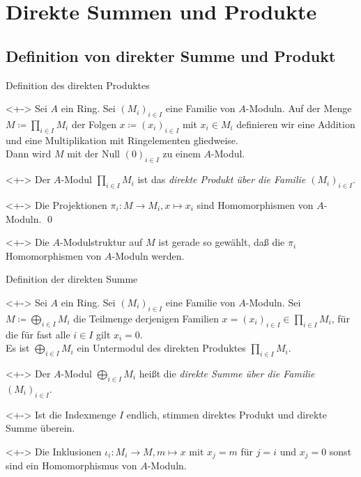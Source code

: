 \section{Direkte Summen und Produkte}

\subsection{Definition von direkter Summe und Produkt}

\begin{frame}{Definition des direkten Produktes}
	\begin{visibleenv}<+->
		Sei \(A\) ein Ring. Sei \((M_i)_{i \in I}\) eine Familie von \(A\)-Moduln. Auf der
		Menge \(M \coloneqq \prod\limits_{i \in I} M_i\) der Folgen
		\(x \coloneqq (x_i)_{i \in I}\) mit \(x_i \in M_i\) definieren wir eine Addition
		und eine Multiplikation mit Ringelementen gliedweise.
		\\
		Dann wird \(M\) mit der Null \((0)_{i \in I}\) zu einem \(A\)-Modul.
	\end{visibleenv}
	\begin{definition}<+->
		Der \(A\)-Modul \(\prod\limits_{i \in I} M_i\) ist das \emph{direkte Produkt über die
		Familie \((M_i)_{i \in I}\)}.
	\end{definition}
	\begin{proposition}<+->
		Die Projektionen \(\pi_i\colon M \to M_i, x \mapsto x_i\) sind Homomorphismen von
		\(A\)-Moduln.
		\qed
	\end{proposition}
	\begin{visibleenv}<+->
		Die \(A\)-Modulstruktur auf \(M\) ist gerade so gewählt, daß die \(\pi_i\)
		Homomorphismen von \(A\)-Moduln werden.
	\end{visibleenv}
\end{frame}

\begin{frame}{Definition der direkten Summe}
	\begin{visibleenv}<+->
		Sei \(A\) ein Ring. Sei \((M_i)_{i \in I}\) eine Familie von \(A\)-Moduln. Sei
		\(M \coloneqq \bigoplus\limits_{i \in I} M_i\) die Teilmenge derjenigen Familien
		\(x = (x_i)_{i \in I}
		\in \prod\limits_{i \in I} M_i\), für die für fast alle \(i \in I\) gilt \(x_i = 0\).
		\\
		Es ist \(\bigoplus\limits_{i \in I} M_i\) ein Untermodul des direkten Produktes
		\(\prod\limits_{i \in I} M_i\).
	\end{visibleenv}
	\begin{definition}<+->
		Der \(A\)-Modul \(\bigoplus\limits_{i \in I} M_i\) heißt die \emph{direkte Summe über
		die Familie \((M_i)_{i \in I}\)}.
	\end{definition}
	\begin{remark}<+->
		Ist die Indexmenge \(I\) endlich, stimmen direktes Produkt und direkte Summe überein.
	\end{remark}
	\begin{proposition}<+->
		Die Inklusionen \(\iota_i\colon M_i \to M, m \mapsto x\) mit \(x_j = m\) für \(j = i\) und
		\(x_j = 0\) sonst sind ein Homomorphismus von \(A\)-Moduln.
	\end{proposition}
\end{frame}

